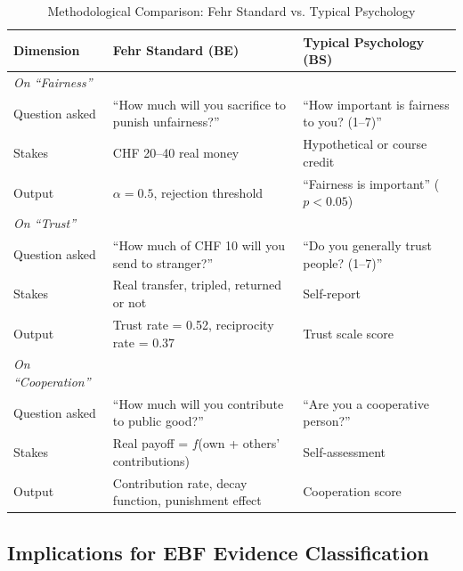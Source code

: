\documentclass[11pt, a4paper]{article}
\begin{document}
\begin{table}[htbp]
\centering
\caption{Methodological Comparison: Fehr Standard vs. Typical Psychology}
\label{tab:evd-fehr-vs-psych}
\renewcommand{\arraystretch}{1.3}
\begin{tabular}{@{}p{4cm}p{5cm}p{5cm}@{}}
\toprule
\textbf{Dimension} & \textbf{Fehr Standard (BE)} & \textbf{Typical Psychology (BS)} \\
\midrule
\textit{On ``Fairness''} & & \\
Question asked & ``How much will you sacrifice to punish unfairness?'' & ``How important is fairness to you? (1--7)'' \\
Stakes & CHF 20--40 real money & Hypothetical or course credit \\
Output & $\alpha = 0.5$, rejection threshold & ``Fairness is important'' ($p < 0.05$) \\
\addlinespace
\textit{On ``Trust''} & & \\
Question asked & ``How much of CHF 10 will you send to stranger?'' & ``Do you generally trust people? (1--7)'' \\
Stakes & Real transfer, tripled, returned or not & Self-report \\
Output & Trust rate = 0.52, reciprocity rate = 0.37 & Trust scale score \\
\addlinespace
\textit{On ``Cooperation''} & & \\
Question asked & ``How much will you contribute to public good?'' & ``Are you a cooperative person?'' \\
Stakes & Real payoff = $f$(own + others' contributions) & Self-assessment \\
Output & Contribution rate, decay function, punishment effect & Cooperation score \\
\bottomrule
\end{tabular}
\end{table}

\subsection{Implications for EBF Evidence Classification}
\end{document}
